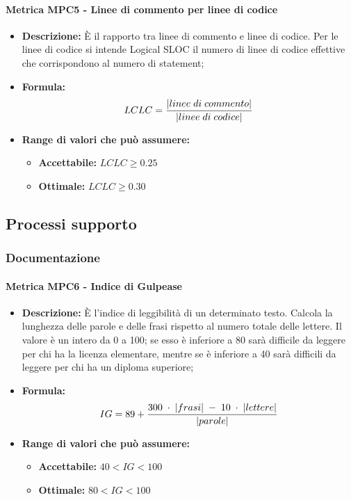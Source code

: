     \paragraph{Metrica MPC5 - Linee di commento per linee di codice}
    \begin{itemize}
        \item \textbf{Descrizione:} È il rapporto tra linee di commento e linee di codice. Per le linee di codice si intende Logical SLOC il numero di linee di codice effettive che corrispondono al numero di statement;
        \item \textbf{Formula:}$$LCLC = {|linee \; di \; commento| \over |linee \; di \; codice|}$$
        \item \textbf{Range di valori che può assumere:}
        \begin{itemize}
            \item \textbf{Accettabile:} $LCLC \geq 0.25$
            \item \textbf{Ottimale:} $LCLC \geq 0.30$
        \end{itemize}
    \end{itemize}

\subsection{Processi supporto}

\subsubsection{Documentazione}
    \paragraph{Metrica MPC6 - Indice di Gulpease}
    \begin{itemize}
        \item \textbf{Descrizione:} È l'indice di leggibilità di un determinato testo. Calcola la lunghezza delle parole e delle frasi rispetto al numero totale delle lettere. Il valore è un intero da 0 a 100; se esso è inferiore a 80 sarà difficile da leggere per chi ha la licenza elementare, mentre se è inferiore a 40 sarà difficili da leggere per chi ha un diploma superiore;
        \item \textbf{Formula:} $$IG = 89 + {{300 \; \cdot \; |frasi| \; - \; 10 \; \cdot \; |lettere|}\over |parole|}$$
        \item \textbf{Range di valori che può assumere:}
        \begin{itemize}
            \item \textbf{Accettabile:} $40 < IG < 100$
            \item \textbf{Ottimale:} $80 < IG < 100$
        \end{itemize}
    \end{itemize}

